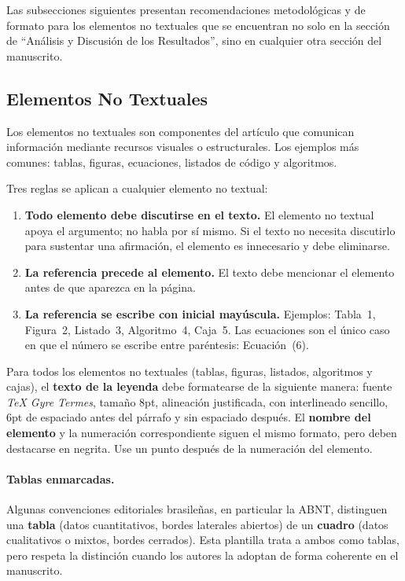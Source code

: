 \documentclass[spanish]{rbie2026}%
\begin{document}
Las subsecciones siguientes presentan recomendaciones metodológicas y de formato para los elementos no textuales que se encuentran no solo en la sección de ``Análisis y Discusión de los Resultados'', sino en cualquier otra sección del manuscrito.


\subsection{Elementos No Textuales}

Los elementos no textuales son componentes del artículo que comunican información mediante recursos visuales o estructurales. Los ejemplos más comunes: tablas, figuras, ecuaciones, listados de código y algoritmos.

Tres reglas se aplican a cualquier elemento no textual:

\begin{enumerate}
    \item \textbf{Todo elemento debe discutirse en el texto.} El elemento no textual apoya el argumento; no habla por sí mismo. Si el texto no necesita discutirlo para sustentar una afirmación, el elemento es innecesario y debe eliminarse.

    \item \textbf{La referencia precede al elemento.} El texto debe mencionar el elemento antes de que aparezca en la página.

    \item \textbf{La referencia se escribe con inicial mayúscula.} Ejemplos: Tabla~1, Figura~2, Listado~3, Algoritmo~4, Caja~5. Las ecuaciones son el único caso en que el número se escribe entre paréntesis: Ecuación~(6).
\end{enumerate}

Para todos los elementos no textuales (tablas, figuras, listados, algoritmos y cajas), el \textbf{texto de la leyenda} debe formatearse de la siguiente manera: fuente \textit{TeX Gyre Termes}, tamaño 8pt, alineación justificada, con interlineado sencillo, 6pt de espaciado antes del párrafo y sin espaciado después. El \textbf{nombre del elemento} y la numeración correspondiente siguen el mismo formato, pero deben destacarse en negrita. Use un punto después de la numeración del elemento.

\paragraph{Tablas enmarcadas.} Algunas convenciones editoriales brasileñas, en particular la ABNT, distinguen una \textbf{tabla} (datos cuantitativos, bordes laterales abiertos) de un \textbf{cuadro} (datos cualitativos o mixtos, bordes cerrados). Esta plantilla trata a ambos como tablas, pero respeta la distinción cuando los autores la adoptan de forma coherente en el manuscrito.
\end{document}

